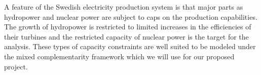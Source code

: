 \documentclass[10pt,a4paper]{article}
\begin{document}
A feature of the Swedish electricity production system is that major parts as hydropower and nuclear power are subject to caps on the production capabilities. The growth of hydropower is restricted to limited increases in the efficiencies of their turbines and the restricted capacity of nuclear power is the target for the analysis. These types of capacity constraints are well suited to be modeled under the mixed complementarity framework \citep{raey} which we will use for our proposed project.

\begin{comment}
\textbf{Modeling electricity sector}
Disaggregated electricity sector
- Coal, Gas, Oil, Nuclear, Hydro, Wind
- to incorporate natural resource constraints on hydro and wind, the expansions of wind and hydro power are bounded by the levels of hydro and wind resource factors, respectively.

\textbf{Scenarios}
- Scenario 1: Phase out of existing nuclear power (without expansion of hydro power plant)
- Scenario 2: Phase out of existing nuclear power plant (with expansion of hydro power plant)
- Scenario 3: Phase out of existing nuclear power plant (without expansion of hydro power plant) and CO2 commitment
- Scenario 4: Phase out of existing nuclear power plant (with expansion of hydro power plant) and CO2 commitment

\end{comment}


\end{document}
